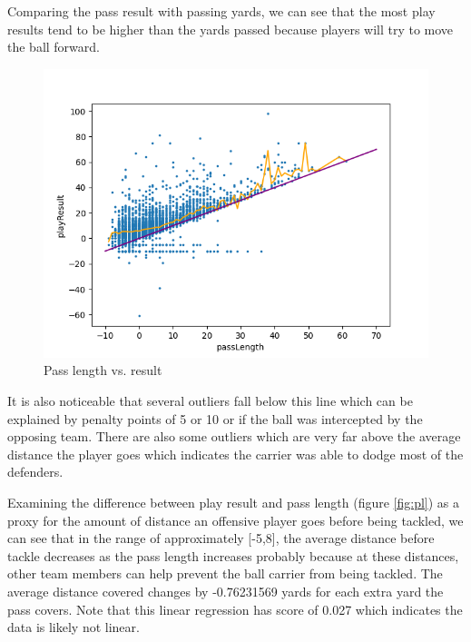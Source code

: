 \documentclass[bibtex, sigconf, hyperref={colorlinks=true,linkcolor=blue,urlcolor=blue}]{acmart}
\begin{document}
Comparing the pass result with passing yards, we can see that the most play results
tend to be higher than the yards passed because players will try to move the
ball forward.
\begin{figure}[h]
  \centering
  \includegraphics[width=\linewidth]{length_v_result}
  \caption{Pass length vs. result}
\end{figure}
It is also noticeable that several outliers fall below this line which can be
explained by penalty points of 5 or 10 or if the ball was intercepted by the
opposing team. There are also some outliers which are very far above the average
distance the player goes which indicates the carrier was able to dodge most of
the defenders.

Examining the difference between play result and pass length (figure
\ref{fig:pl}) as a proxy for the amount of distance an offensive player goes
before being tackled, we can see that in the range of approximately [-5,8], the
average distance before tackle decreases as the pass length increases probably
because at these distances, other team members can help prevent the ball carrier
from being tackled. The average distance covered changes by -0.76231569 yards
for each extra yard the pass covers. Note that this linear regression has score
of 0.027 which indicates the data is likely not linear.
\end{document}
